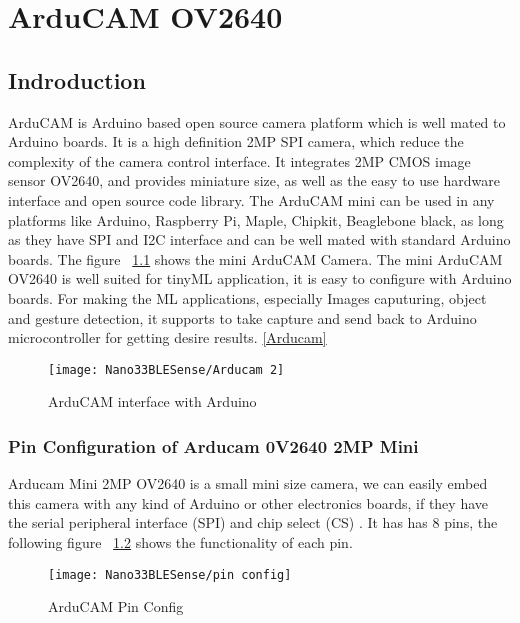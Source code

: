\chapter{ArduCAM OV2640}

\section{Indroduction}

ArduCAM is Arduino based open source camera platform which is well mated to Arduino boards. It is a high definition 2MP SPI camera, which reduce the complexity of the camera control interface. It integrates 2MP CMOS image sensor OV2640, and provides miniature size, as well as the easy to use hardware interface and open source code library. The ArduCAM mini can be used in any platforms like Arduino, Raspberry Pi, Maple, Chipkit, Beaglebone black, as long as they have SPI and I2C interface and can be well mated with standard Arduino boards. The figure ~\ref{Arducam} shows the mini ArduCAM Camera. The mini ArduCAM OV2640 is well suited for tinyML application, it is easy to configure with Arduino boards. For making the ML applications, especially Images caputuring, object and gesture detection, it supports to take capture and send back to Arduino microcontroller for getting desire results. \href{https://www.arducam.com/product/arducam-2mp-spi-camera-b0067-arduino/}{[Arducam]}

\begin{figure}[ht]
	\centering
	\texttt{[image: Nano33BLESense/Arducam 2]}
	\caption{ArduCAM interface with Arduino}
	\label{Arducam}
\end{figure}

\subsection{Pin Configuration of Arducam 0V2640 2MP Mini}

Arducam Mini 2MP OV2640 is a small mini size camera, we can easily embed this camera with any kind of Arduino or other electronics boards, if they have the serial peripheral interface (SPI) and  chip select (CS) . It has has 8 pins, the following figure ~\ref{pin config} shows the functionality of each pin.

\begin{figure}[ht]
	\centering
	\texttt{[image: Nano33BLESense/pin config]}
	\caption{ArduCAM Pin Config}
	\label{pin config}
\end{figure}

